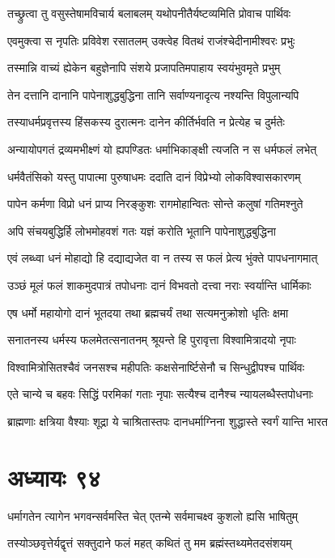 \twolineshloka
{तच्छ्रुत्वा तु वसुस्तेषामविचार्य बलाबलम्}
{यथोपनीतैर्यष्टव्यमिति प्रोवाच पार्थिवः}


\twolineshloka
{एवमुक्त्वा स नृपतिः प्रविवेश रसातलम्}
{उक्त्वेह वितथं राजंश्चेदीनामीश्वरः प्रभुः}


\twolineshloka
{तस्मान्नि वाच्यं ह्येकेन बहुज्ञेनापि संशये}
{प्रजापतिमपाहाय स्वयंभुवमृते प्रभुम्}


\twolineshloka
{तेन दत्तानि दानानि पापेनाशुद्धबुद्धिना}
{तानि सर्वाण्यनादृत्य नश्यन्ति विपुलान्यपि}


\twolineshloka
{तस्याधर्मप्रवृत्तस्य हिंसकस्य दुरात्मनः}
{दानेन कीर्तिर्भवति न प्रेत्येह च दुर्मतेः}


\twolineshloka
{अन्यायोपगतं द्रव्यमभीक्ष्णं यो ह्यपण्डितः}
{धर्माभिकाङ्क्षी त्यजति न स धर्मफलं लभेत्}


\twolineshloka
{धर्मवैतंसिको यस्तु पापात्मा पुरुषाधमः}
{ददाति दानं विप्रेभ्यो लोकविश्वासकारणम्}


\twolineshloka
{पापेन कर्मणा विप्रो धनं प्राप्य निरङ्कुशः}
{रागमोहान्वितः सोन्ते कलुषां गतिमश्नुते}


\twolineshloka
{अपि संचयबुद्धिर्हि लोभमोहवशं गतः}
{यज्ञं करोति भूतानि पापेनाशुद्धबुद्धिना}


\twolineshloka
{एवं लब्ध्वा धनं मोहाद्यो हि दद्याद्यजेत वा}
{न तस्य स फलं प्रेत्य भुंक्ते पापधनागमात्}


\twolineshloka
{उञ्छं मूलं फलं शाकमुदपात्रं तपोधनाः}
{दानं विभवतो दत्त्वा नराः स्वर्यान्ति धार्मिकाः}


\twolineshloka
{एष धर्मो महायोगो दानं भूतदया तथा}
{ब्रह्मचर्यं तथा सत्यमनुक्रोशो धृतिः क्षमा}


\twolineshloka
{सनातनस्य धर्मस्य फलमेतत्सनातनम्}
{श्रूयन्ते हि पुरावृत्ता विश्वामित्रादयो नृपाः}


\twolineshloka
{विश्वामित्रोसितश्चैवं जनसश्च महीपतिः}
{कक्षसेनार्ष्टिसेनौ च सिन्धुद्वीपश्च पार्थिवः}


\twolineshloka
{एते चान्ये च बहवः सिद्धिं परमिकां गताः}
{नृपाः सत्यैश्च दानैश्च न्यायलब्धैस्तपोधनाः}


\twolineshloka
{ब्राह्मणाः क्षत्रिया वैश्याः शूद्रा ये चाश्रितास्तपः}
{दानधर्माग्निना शुद्धास्ते स्वर्गं यान्ति भारत}


\chapter{अध्यायः ९४}
\twolineshloka
{धर्मागतेन त्यागेन भगवन्सर्वमस्ति चेत्}
{एतन्मे सर्वमाचक्ष्व कुशलो ह्यसि भाषितुम्}


\twolineshloka
{तस्योञ्छवृत्तेर्यद्वृत्तं सक्तुदाने फलं महत्}
{कथितं तु मम ब्रह्मंस्तथ्यमेतदसंशयम्}


